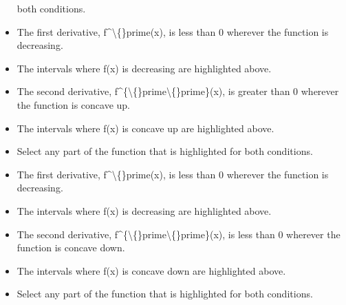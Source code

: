 \documentclass{article}
\begin{document}
\begin{itemize}
                        both conditions.
  \item The first derivative, f\textasciicircum{}\textbackslash\{\}prime(x), is less
                    than 0 wherever the function is decreasing.
  \item The intervals
                        where f(x) is decreasing
                        are
                        highlighted above.
  \item The second derivative, f\textasciicircum{}\{\textbackslash\{\}prime\textbackslash\{\}prime\}(x), is greater
                    than 0 wherever the function is concave up.
  \item The intervals
                        where f(x) is concave up
                        are
                        highlighted above.
  \item Select any part of the function that is highlighted for
                        both conditions.
  \item The first derivative, f\textasciicircum{}\textbackslash\{\}prime(x), is less
                    than 0 wherever the function is decreasing.
  \item The intervals
                        where f(x) is decreasing
                        are
                        highlighted above.
  \item The second derivative, f\textasciicircum{}\{\textbackslash\{\}prime\textbackslash\{\}prime\}(x), is less
                    than 0 wherever the function is concave down.
  \item The intervals
                        where f(x) is concave down
                        are
                        highlighted above.
  \item Select any part of the function that is highlighted for
                        both conditions.
\end{itemize}
\end{document}
